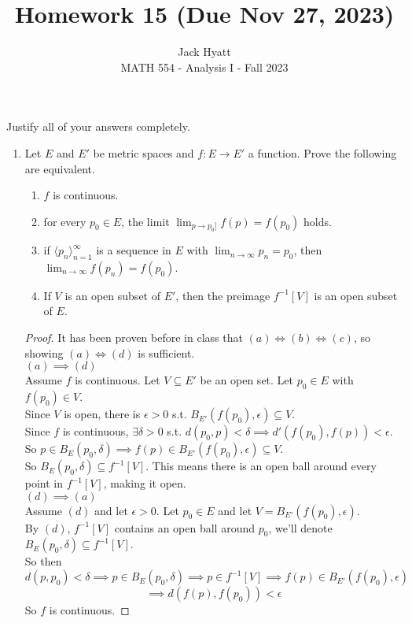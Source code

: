 \documentclass[14pt]{extarticle}
\begin{document}
	
	
	
	\title{Homework 15 (Due Nov 27, 2023)}
	\author{Jack Hyatt\\ %
		MATH 554 - Analysis I - Fall 2023} 
	
	\maketitle
	
	Justify all of your answers completely.\\
	
	
	\medskip 
	
	\begin{enumerate}
		\item Let $E$ and $E'$ be metric spaces and $f:E\rightarrow E'$ a function. Prove the following are equivalent.
		\begin{enumerate}
			\item $f$ is continuous.
			\item for every $p_0 \in E$, the limit $\lim_{p\rightarrow p_0]} f(p) = f(p_0)$ holds.
			\item  if $\langle p_n \rangle_{n=1}^\infty$ is a sequence in $E$ with $\lim_{n\rightarrow\infty} p_n = p_0$, then $\lim_{n\rightarrow\infty} f(p_n) = f(p_0)$.
			\item If $V$ is an open subset of $E'$, then the preimage $f^{-1}[V]$ is an open subset of $E$.
		\end{enumerate}
		\begin{proof}
			It has been proven before in class that $(a) \iff (b) \iff (c)$, so showing $(a) \iff (d)$ is sufficient.\\
			$(a) \implies (d)$\\
			Assume $f$ is continuous. Let $V\subseteq E'$ be an open set. Let $p_0 \in E$ with $f(p_0) \in V$.\\
			Since $V$ is open, there is $\epsilon>0$ s.t. $B_{E'}(f(p_0),\epsilon)\subseteq V$.\\
			Since $f$ is continuous, $\exists\delta>0$ s.t. $d(p_0,p)<\delta \implies d'(f(p_0),f(p)) < \epsilon$.\\
			So $p \in B_E(p_0,\delta) \implies f(p) \in B_{E'}(f(p_0),\epsilon)\subseteq V$.\\
			So $B_E(p_0,\delta) \subseteq f^{-1}[V]$. This means there is an open ball around every point in $f^{-1}[V]$, making it open.\\
			$(d)\implies(a)$\\
			Assume $(d)$ and let $\epsilon>0$. Let $p_0 \in E$ and let $V=B_{E'}(f(p_0),\epsilon)$.\\
			By $(d)$, $f^{-1}[V]$ contains an open ball around $p_0$, we'll denote $B_E(p_0,\delta)\subseteq f^{-1}[V]$.\\
			So then \[d(p,p_0) < \delta \implies p \in B_E(p_0,\delta) \implies p \in f^{-1}[V] \implies f(p) \in B_{E'}(f(p_0),\epsilon)\]
			\[ \implies d(f(p),f(p_0)) < \epsilon\]
			So $f$ is continuous.
		\end{proof}
	

\end{enumerate}
\end{document}
